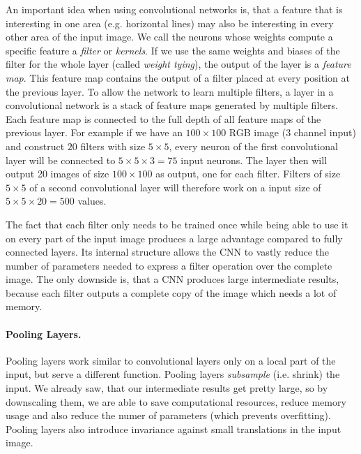 An important idea when using convolutional networks is, that a feature that is interesting in one area (e.g. horizontal lines) may also be interesting in every other area of the input image. We call the neurons whose weights compute a specific feature a \textit{filter} or \textit{kernels}. If we use the same weights and biases of the filter for the whole layer (called \textit{weight tying}), the output of the layer is a \textit{feature map}. This feature map contains the output of a filter placed at every position at the previous layer. To allow the network to learn multiple filters, a layer in a convolutional network is a stack of feature maps generated by multiple filters. Each feature map is connected to the full depth of all feature maps of the previous layer. For example if we have an $100 \times 100$ RGB image (3 channel input) and construct $20$ filters with size $5\times 5$, every neuron of the first convolutional layer will be connected to $5\times 5 \times 3 = 75$ input neurons. The layer then will output 20 images of size $100 \times 100$ as output, one for each filter. Filters of size $5\times 5$ of a second convolutional layer will therefore work on a input size of $5\times 5 \times 20 = 500$ values.

The fact that each filter only needs to be trained once while being able to use it on every part of the input image produces a large advantage compared to fully connected layers. Its internal structure allows the CNN to vastly reduce the number of parameters needed to express a filter operation over the complete image. The only downside is, that a CNN produces large intermediate results, because each filter outputs a complete copy of the image which needs a lot of memory.

\paragraph{Pooling Layers.} Pooling layers work similar to convolutional layers only on a local part of the input, but serve a different function. Pooling layers \textit{subsample} (i.e. shrink) the input. We already saw, that our intermediate results get pretty large, so by downscaling them, we are able to save computational resources, reduce memory usage and also reduce the numer of parameters (which prevents overfitting). Pooling layers also introduce invariance against small translations in the input image. 

